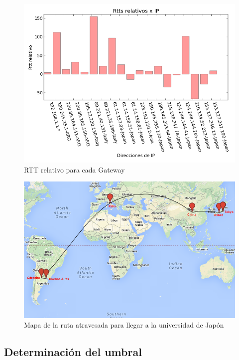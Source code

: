 \begin{figure}[H]
	\begin{center}
		  \includegraphics[scale=0.5]{../graficos_informe/jsc_rtt.png}
		  \caption{RTT relativo para cada Gateway}
		  \label{fig:contra1}
	\end{center}
\end{figure}

\begin{figure}[H]
	\begin{center}
		  \includegraphics[scale=0.4]{../mapas/mapa_japon.png}
		  \caption{Mapa de la ruta atravesada para llegar a la universidad de Japón}
		  \label{fig:contra1}
	\end{center}
\end{figure}

\subsection{Determinación del umbral}

